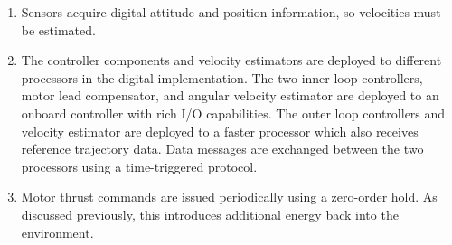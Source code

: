 \begin{enumerate}
 \item Sensors acquire digital attitude and position information, so velocities must be estimated.
 \item The controller components and velocity estimators are deployed to different processors in the 
digital implementation.  The two inner loop controllers, motor lead compensator, and angular velocity
estimator are deployed to an onboard controller with rich I/O capabilities.  The outer loop 
controllers and velocity estimator are deployed to a faster processor which also receives 
reference trajectory data.  Data messages are exchanged between the two processors using a 
time-triggered protocol.
 \item Motor thrust commands are issued periodically using a zero-order hold.  As discussed
previously, this introduces additional energy back into the environment.                                                          
\end{enumerate}










